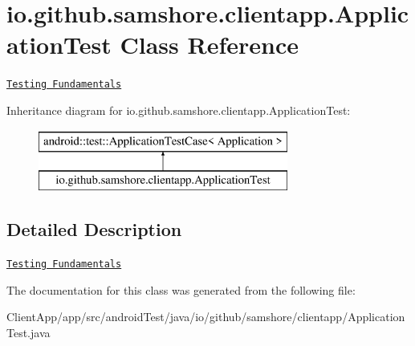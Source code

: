 \hypertarget{classio_1_1github_1_1samshore_1_1clientapp_1_1_application_test}{}\section{io.\+github.\+samshore.\+clientapp.\+Application\+Test Class Reference}
\label{classio_1_1github_1_1samshore_1_1clientapp_1_1_application_test}


\href{http://d.android.com/tools/testing/testing_android.html}{\tt Testing Fundamentals}  


Inheritance diagram for io.\+github.\+samshore.\+clientapp.\+Application\+Test\+:\begin{figure}[H]
\begin{center}
\leavevmode
\includegraphics[height=2.000000cm]{classio_1_1github_1_1samshore_1_1clientapp_1_1_application_test}
\end{center}
\end{figure}


\subsection{Detailed Description}
\href{http://d.android.com/tools/testing/testing_android.html}{\tt Testing Fundamentals} 

The documentation for this class was generated from the following file\+:\begin{DoxyCompactItemize}
\item 
Client\+App/app/src/android\+Test/java/io/github/samshore/clientapp/Application\+Test.\+java\end{DoxyCompactItemize}
